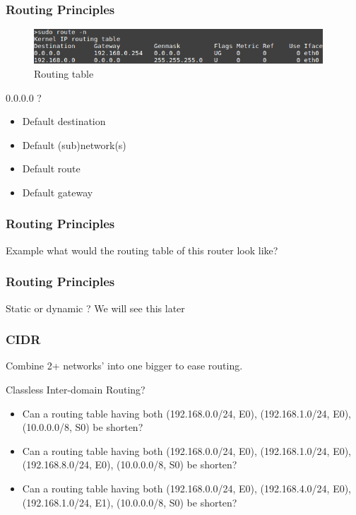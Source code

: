   \begin{frame}
    \frametitle{Routing Principles}
    \begin{figure}[t]
      \centering
      \includegraphics[height=1.3cm]{./imgs/routing-table.png}
      \caption{Routing table}
      \label{fig:routing_table}
    \end{figure}
    \begin{block}{0.0.0.0 ?}
      \begin{itemize}
        \item Default destination
        \item Default (sub)network(s)
        \item Default route
        \item Default gateway
      \end{itemize}
    \end{block}
  \end{frame}

  \begin{frame}
    \frametitle{Routing Principles}
    \begin{block}{Example}
      what would the routing table of this router look like?
    \end{block}
  \end{frame}

  \begin{frame}
    \frametitle{Routing Principles}
    \begin{block}{Static or dynamic ?}
      We will see this later
    \end{block}
  \end{frame}

  \begin{frame}
    \frametitle{CIDR}
    Combine 2+ networks' into one bigger to ease routing.

    \begin{block}{Classless Inter-domain Routing?}
      \begin{itemize}
        \item Can a routing table having both (192.168.0.0/24, E0), (192.168.1.0/24, E0), (10.0.0.0/8, S0) be shorten?
        \item Can a routing table having both (192.168.0.0/24, E0), (192.168.1.0/24, E0), (192.168.8.0/24, E0), (10.0.0.0/8, S0) be shorten?
        \item Can a routing table having both (192.168.0.0/24, E0), (192.168.4.0/24, E0), (192.168.1.0/24, E1), (10.0.0.0/8, S0) be shorten?
      \end{itemize}
    \end{block}
  \end{frame}

